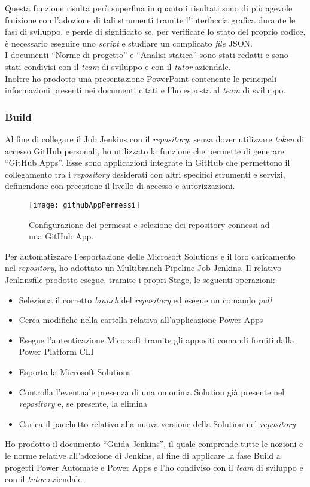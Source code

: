 Questa funzione risulta però superflua in quanto i risultati sono di più agevole fruizione con l'adozione di tali strumenti tramite l'interfaccia grafica durante le fasi di sviluppo, e perde di significato se, per verificare lo stato del proprio codice, è necessario eseguire uno \emph{script} e studiare un complicato \emph{file} JSON.\\ 
I documenti “Norme di progetto” e “Analisi statica” sono stati redatti e sono stati condivisi con il \emph{team} di sviluppo e con il \emph{tutor} aziendale.\\  
Inoltre ho prodotto una presentazione PowerPoint contenente le principali informazioni presenti nei documenti citati e l'ho esposta al \emph{team} di sviluppo. 

\subsubsection*{Build}
Al fine di collegare il Job Jenkins con il \emph{repository}, senza dover utilizzare \emph{token} di accesso GitHub personali, ho utilizzato la funzione che permette di generare “GitHub Apps”. Esse sono applicazioni integrate in GitHub che permettono il collegamento tra i \emph{repository} desiderati con altri specifici strumenti e servizi, definendone con precisione il livello di accesso e autorizzazioni.  
\begin{figure}[htbp] 
    \centering 
    \texttt{[image: githubAppPermessi]} 
    \caption{Configurazione dei permessi e selezione dei repository connessi ad una GitHub App.}
    \label{fig:githubAppPermessi}
\end{figure}
\newline Per automatizzare l'esportazione delle Microsoft Solutions e il loro caricamento nel \emph{repository}, ho adottato un Multibranch Pipeline Job Jenkins. Il relativo Jenkinsfile prodotto esegue, tramite i propri Stage, le seguenti operazioni:
\begin{itemize}
    \item Seleziona il corretto \emph{branch} del \emph{repository} ed esegue un comando \emph{pull}
    \item Cerca modifiche nella cartella relativa all'applicazione Power Apps
    \item Esegue l'autenticazione Micorsoft tramite gli appositi comandi forniti dalla Power Platform CLI
    \item Esporta la Microsoft Solutions
    \item Controlla l'eventuale presenza di una omonima Solution già presente nel \emph{repository} e, se presente, la elimina 
    \item Carica il pacchetto relativo alla nuova versione della Solution nel \emph{repository}
\end{itemize}
Ho prodotto il documento “Guida Jenkins”, il quale comprende tutte le nozioni e le norme relative all'adozione di Jenkins, al fine di applicare la fase Build a progetti Power Automate e Power Apps e l'ho condiviso con il \emph{team} di sviluppo e con il \emph{tutor} aziendale.

